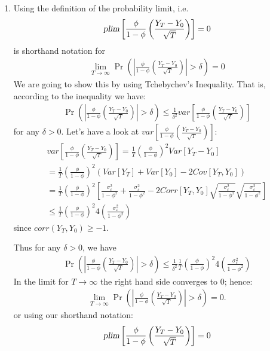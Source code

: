 \begin{enumerate}
\begin{enumerate}
  \item
  Using the definition of the probability limit, i.e.\
  \begin{align*}
  \textsl{plim}\left[\frac{\phi}{1-\phi}\left(\frac{Y_T - Y_0}{\sqrt{T}}\right)\right] = 0
  \end{align*}
  is shorthand notation for
  \begin{align*}
  \lim_{T\rightarrow \infty} \Pr\left(\left|\frac{\phi}{1-\phi}\left(\frac{Y_T - Y_0}{\sqrt{T}}\right)\right|> \delta\right) = 0
  \end{align*}
  We are going to show this by using Tchebychev's Inequality.
  That is, according to the inequality we have:
  \begin{align*}
  \Pr\left(\left|\frac{\phi}{1-\phi}\left(\frac{Y_T - Y_0}{\sqrt{T}}\right)\right|> \delta\right) \leq \frac{1}{\delta^2} var\left[\frac{\phi}{1-\phi}\left(\frac{Y_T - Y_0}{\sqrt{T}}\right)\right]
  \end{align*}
  for any \(\delta>0\).
  Let's have a look at \(var\left[\frac{\phi}{1-\phi}\left(\frac{Y_T - Y_0}{\sqrt{T}}\right)\right]\):
  \begin{multline*}
  var\left[\frac{\phi}{1-\phi}\left(\frac{Y_T - Y_0}{\sqrt{T}}\right)\right]
  = \frac{1}{T}{\left(\frac{\phi}{1-\phi}\right)}^2 Var[Y_T - Y_0]
  \\
  = \frac{1}{T}{\left(\frac{\phi}{1-\phi}\right)}^2 \left(Var[Y_T] + Var[Y_0] - 2 Cov[Y_T,Y_0]\right)
  \\
  = \frac{1}{T}{\left(\frac{\phi}{1-\phi}\right)}^2 \left[\frac{\sigma_\varepsilon^2}{1-\phi^2} + \frac{\sigma_\varepsilon^2}{1-\phi^2} - 2 Corr[Y_T,Y_0]\sqrt{\frac{\sigma_\varepsilon^2}{1-\phi^2}}\sqrt{\frac{\sigma_\varepsilon^2}{1-\phi^2}} \right]
  \\
  \leq \frac{1}{T}{\left(\frac{\phi}{1-\phi}\right)}^2 4 \left(\frac{\sigma_\varepsilon^2}{1-\phi^2}\right)
  \end{multline*}
  since \(corr(Y_T,Y_0) \geq -1\).

  Thus for any \(\delta>0\), we have
  \begin{align*}
  \Pr\left(\left|\frac{\phi}{1-\phi}\left(\frac{Y_T - Y_0}{\sqrt{T}}\right)\right|> \delta\right) \leq \frac{1}{\delta^2} \frac{1}{T}{\left(\frac{\phi}{1-\phi}\right)}^2 4 \left(\frac{\sigma_\varepsilon^2}{1-\phi^2}\right)
  \end{align*}
  In the limit for \(T\rightarrow \infty \) the right hand side converges to 0; hence:
  \begin{align*}
  \lim_{T\rightarrow \infty} \Pr\left(\left|\frac{\phi}{1-\phi}\left(\frac{Y_T - Y_0}{\sqrt{T}}\right)\right|> \delta\right) = 0.
  \end{align*}
  or using our shorthand notation:
  \begin{align*}
  \textsl{plim}\left[\frac{\phi}{1-\phi}\left(\frac{Y_T - Y_0}{\sqrt{T}}\right)\right] = 0
  \end{align*}
  

\end{enumerate}
\end{enumerate}

